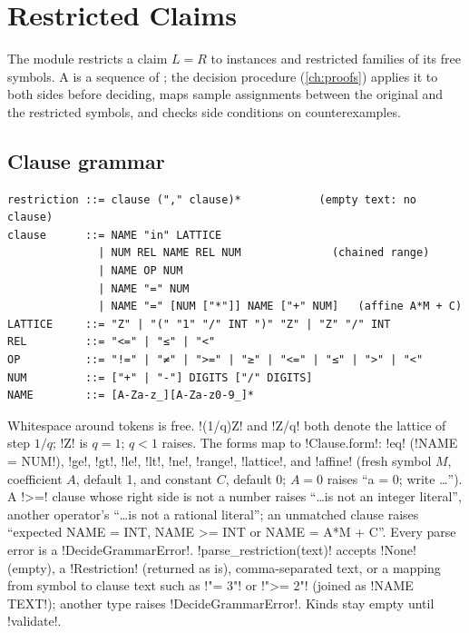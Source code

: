 \section{Restricted Claims}\label{sec:semantics-restrict}

The module  restricts a claim $L=R$ to instances and restricted families of its free symbols. A  is a sequence of ; the decision procedure (\cref{ch:proofs}) applies it to both sides before deciding, maps sample assignments between the original and the restricted symbols, and checks side conditions on counterexamples.

\subsection{Clause grammar}\label{sec:semantics-restrict-grammar}

\begin{lstlisting}[style=grammar,caption={Clause grammar of \texttt{parse\_clause}.}]
restriction ::= clause ("," clause)*            (empty text: no clause)
clause      ::= NAME "in" LATTICE
              | NUM REL NAME REL NUM              (chained range)
              | NAME OP NUM
              | NAME "=" NUM
              | NAME "=" [NUM ["*"]] NAME ["+" NUM]   (affine A*M + C)
LATTICE     ::= "Z" | "(" "1" "/" INT ")" "Z" | "Z" "/" INT
REL         ::= "<=" | "≤" | "<"
OP          ::= "!=" | "≠" | ">=" | "≥" | "<=" | "≤" | ">" | "<"
NUM         ::= ["+" | "-"] DIGITS ["/" DIGITS]
NAME        ::= [A-Za-z_][A-Za-z0-9_]*
\end{lstlisting}

\noindent Whitespace around tokens is free. \code!(1/q)Z! and \code!Z/q! both denote the lattice of step $1/q$; \code!Z! is $q=1$; $q<1$ raises. The forms map to \py!Clause.form!: \code!eq! (\code!NAME = NUM!), \code!ge!, \code!gt!, \code!le!, \code!lt!, \code!ne!, \code!range!, \code!lattice!, and \code!affine! (fresh symbol $M$, coefficient $A$, default 1, and constant $C$, default 0; $A=0$ raises ``a = 0; write \ldots''). A \code!>=! clause whose right side is not a number raises ``\ldots is not an integer literal'', another operator's ``\ldots is not a rational literal''; an unmatched clause raises ``expected NAME = INT, NAME >= INT or NAME = A*M + C''. Every parse error is a \py!DecideGrammarError!. \py!parse_restriction(text)! accepts \py!None! (empty), a \py!Restriction! (returned as is), comma-separated text, or a mapping from symbol to clause text such as \code!"= 3"! or \code!">= 2"! (joined as \code!NAME TEXT!); another type raises \py!DecideGrammarError!. Kinds stay empty until \py!validate!.

